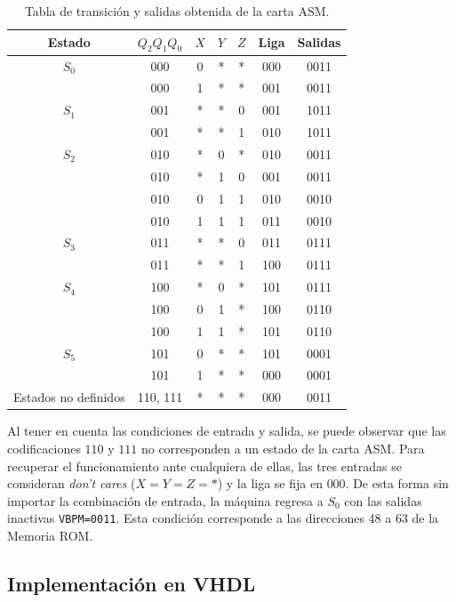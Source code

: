 \documentclass[letterpaper,12pt]{article}
\begin{document}
\begin{table}[H]
\centering
\small
\caption{Tabla de transición y salidas obtenida de la carta ASM.}
\label{tab:transiciones}
\begin{tabular}{ccccccc}
\toprule
Estado & $Q_2Q_1Q_0$ & $X$ & $Y$ & $Z$ & Liga & Salidas \\
\midrule
$S_0$ & 000 & 0 & * & * & 000 & 0011 \\
      & 000 & 1 & * & * & 001 & 0011 \\
$S_1$ & 001 & * & * & 0 & 001 & 1011 \\
      & 001 & * & * & 1 & 010 & 1011 \\
$S_2$ & 010 & * & 0 & * & 010 & 0011 \\
      & 010 & * & 1 & 0 & 001 & 0011 \\
      & 010 & 0 & 1 & 1 & 010 & 0010 \\
      & 010 & 1 & 1 & 1 & 011 & 0010 \\
$S_3$ & 011 & * & * & 0 & 011 & 0111 \\
      & 011 & * & * & 1 & 100 & 0111 \\
$S_4$ & 100 & * & 0 & * & 101 & 0111 \\
      & 100 & 0 & 1 & * & 100 & 0110 \\
      & 100 & 1 & 1 & * & 101 & 0110 \\
$S_5$ & 101 & 0 & * & * & 101 & 0001 \\
      & 101 & 1 & * & * & 000 & 0001 \\
Estados no definidos & 110, 111 & * & * & * & 000 & 0011 \\
\bottomrule
\end{tabular}
\end{table}

\clearpage

Al tener en cuenta las condiciones de entrada y salida, se puede observar que las codificaciones $110$ y $111$ no corresponden a un estado de la carta ASM. Para recuperar el funcionamiento ante cualquiera de ellas, las tres entradas se consideran \emph{don't cares} ($X=Y=Z=*$) y la liga se fija en $000$. De esta forma sin importar la combinación de entrada, la máquina regresa a $S_0$ con las salidas inactivas \texttt{VBPM=0011}. Esta condición corresponde a las direcciones 48 a 63 de la Memoria ROM.

\subsection{Implementación en VHDL}
\end{document}
